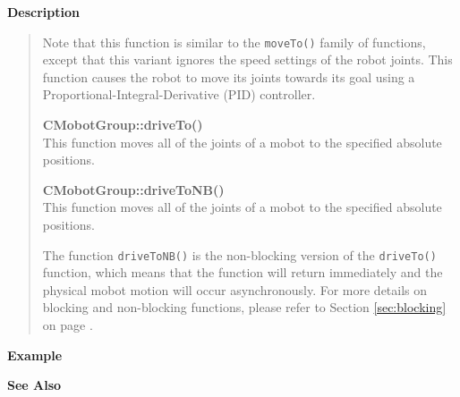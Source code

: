 {\bf Description}\\
\vspace{-12pt}
\begin{quote}
Note that this function is similar to the \texttt{moveTo()} family of functions, except
that this variant ignores the speed settings of the robot joints. This function causes
the robot to move its joints towards its goal using a Proportional-Integral-Derivative (PID)
controller.

{\bf CMobotGroup::driveTo()}\\
This function moves all of the joints of a mobot to the specified absolute positions. 

{\bf CMobotGroup::driveToNB()}\\
This function moves all of the joints of a mobot to the specified absolute positions. 

The function \texttt{driveToNB()} is the non-blocking version of
the \texttt{driveTo()} function, which means that the function will return
immediately and the physical mobot motion will occur asynchronously. For
more details on blocking and non-blocking functions, please refer to 
Section \ref{sec:blocking} on page \pageref{sec:blocking}.\\
\end{quote}

\noindent
{\bf Example}\\
\noindent

\noindent
{\bf See Also}\\

